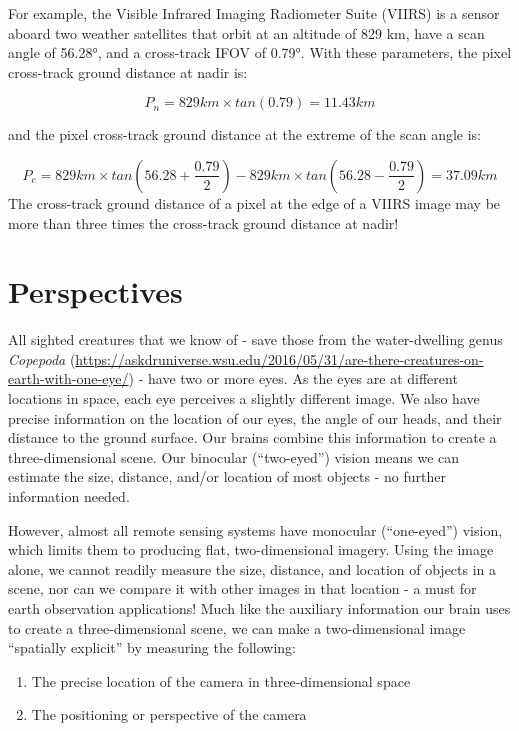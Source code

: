 \documentclass[
]{book}
\providecommand{\tightlist}{%
  \setlength{\itemsep}{0pt}\setlength{\parskip}{0pt}}
\begin{document}
For example, the Visible Infrared Imaging Radiometer Suite (VIIRS) is a sensor aboard two weather satellites that orbit at an altitude of 829 km, have a scan angle of 56.28°, and a cross-track IFOV of 0.79°. With these parameters, the pixel cross-track ground distance at nadir is:

\[
P_n = 829 km × tan(0.79) = 11.43 km
\]

and the pixel cross-track ground distance at the extreme of the scan angle is:

\[
P_c = 829 km × tan(56.28+\frac{0.79}{2}) - 829 km × tan(56.28-\frac{0.79}{2})=37.09km
\]
The cross-track ground distance of a pixel at the edge of a VIIRS image may be more than three times the cross-track ground distance at nadir!

\hypertarget{perspectives}{%
\section{Perspectives}\label{perspectives}}

All sighted creatures that we know of - save those from the water-dwelling genus \emph{Copepoda} (\url{https://askdruniverse.wsu.edu/2016/05/31/are-there-creatures-on-earth-with-one-eye/}) - have two or more eyes. As the eyes are at different locations in space, each eye perceives a slightly different image. We also have precise information on the location of our eyes, the angle of our heads, and their distance to the ground surface. Our brains combine this information to create a three-dimensional scene. Our binocular (``two-eyed'') vision means we can estimate the size, distance, and/or location of most objects - no further information needed.

However, almost all remote sensing systems have monocular (``one-eyed'') vision, which limits them to producing flat, two-dimensional imagery. Using the image alone, we cannot readily measure the size, distance, and location of objects in a scene, nor can we compare it with other images in that location - a must for earth observation applications! Much like the auxiliary information our brain uses to create a three-dimensional scene, we can make a two-dimensional image ``spatially explicit'' by measuring the following:

\begin{enumerate}
\def\labelenumi{\arabic{enumi}.}
\tightlist
\item
  The precise location of the camera in three-dimensional space
\item
  The positioning or perspective of the camera
\end{enumerate}
\end{document}
